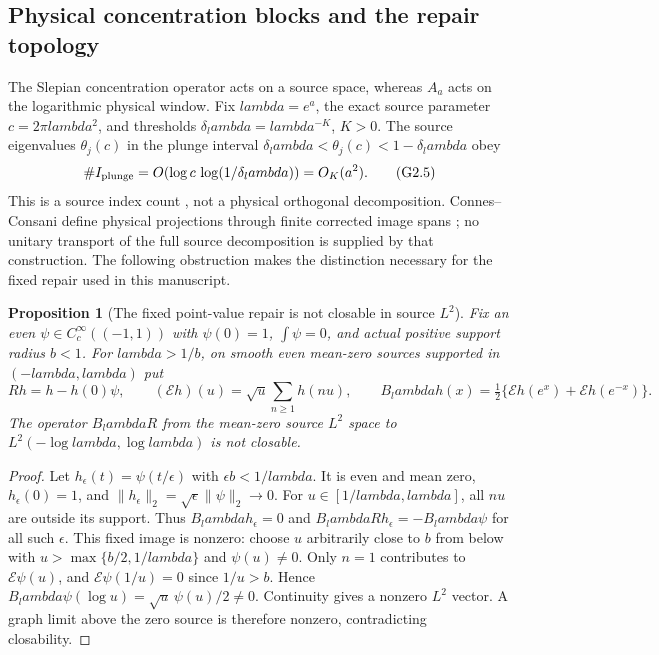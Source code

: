 \documentclass[11pt]{article}
\def\lambda{lambda}%
\newtheorem{proposition}[theorem]{Proposition}
\theoremstyle{remark}
\begin{document}
\subsection{Physical concentration blocks and the repair topology}
The Slepian concentration operator acts on a source space, whereas
$A_a$ acts on the logarithmic physical window. Fix $\lambda=e^a$,
the exact source parameter $c=2\pi\lambda^2$, and thresholds
$\delta_\lambda=\lambda^{-K}$, $K>0$. The source eigenvalues
$\theta_j(c)$ in the plunge interval
$\delta_\lambda<\theta_j(c)<1-\delta_\lambda$ obey
\[
 \#I_{\rm plunge}
 =O\!\left(\log c\,\log(1/\delta_\lambda)\right)=O_K(a^2).
 \tag{G2.5}
\]
This is a source index count \cite{SlepianTransition}, not a physical
orthogonal decomposition. Connes--Consani define physical projections
through finite corrected image spans \cite{ConnesConsani2023}; no
unitary transport of the full source decomposition is supplied by that
construction. The following obstruction makes the distinction necessary
for the fixed repair used in this manuscript.

\begin{proposition}[The fixed point-value repair is not closable in source $L^2$]
\label{prop:v127-nonclosable}
Fix an even $\psi\in C_c^\infty((-1,1))$ with $\psi(0)=1$,
$\int\psi=0$, and actual positive support radius $b<1$.
For $\lambda>1/b$, on smooth even mean-zero sources supported in
$(-\lambda,\lambda)$ put
\[
 Rh=h-h(0)\psi,\qquad
 (\mathcal Eh)(u)=\sqrt u\sum_{n\ge1}h(nu),\qquad
 B_\lambda h(x)=\tfrac12\{\mathcal Eh(e^x)+\mathcal Eh(e^{-x})\}.
\]
The operator $B_\lambda R$ from the mean-zero source $L^2$ space
to $L^2(-\log\lambda,\log\lambda)$ is not closable.
\end{proposition}
\begin{proof}
Let $h_\epsilon(t)=\psi(t/\epsilon)$ with $\epsilon b<1/\lambda$.
It is even and mean zero, $h_\epsilon(0)=1$, and
$\|h_\epsilon\|_2=\sqrt\epsilon\|\psi\|_2\to0$.
For $u\in[1/\lambda,\lambda]$, all $nu$ are outside its support.
Thus $B_\lambda h_\epsilon=0$ and
$B_\lambda R h_\epsilon=-B_\lambda\psi$ for all such $\epsilon$.
This fixed image is nonzero: choose $u$ arbitrarily close to $b$
from below with $u>\max\{b/2,1/\lambda\}$ and $\psi(u)\ne0$.
Only $n=1$ contributes to $\mathcal E\psi(u)$, and
$\mathcal E\psi(1/u)=0$ since $1/u>b$. Hence
$B_\lambda\psi(\log u)=\sqrt u\,\psi(u)/2\ne0$.
Continuity gives a nonzero $L^2$ vector. A graph limit above the zero
source is therefore nonzero, contradicting closability.
\end{proof}
\end{document}
